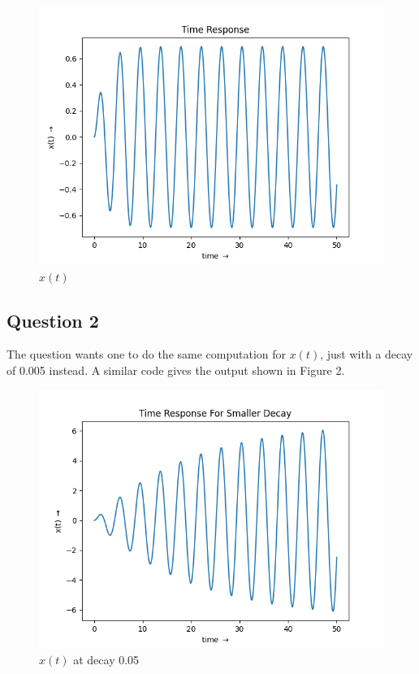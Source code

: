 \documentclass[11pt, a4paper]{article}
\begin{document}
\begin{figure}[!tbh]
   	\centering
  \includegraphics[scale=0.5]{Q1.png} 
    \caption{$x(t)$} 	
    \label{time response}
   \end{figure} 
   
\subsection{Question 2}
The question wants one to do the same computation for $x(t)$, just with a decay of 0.005 instead. A similar code gives the output shown in Figure 2. 

\begin{figure}[!tbh]
   	\centering
  \includegraphics[scale=0.5]{Q2.png} 
    \caption{$x(t)$ at decay 0.05} 	
    \label{time response 2}
   \end{figure} 
   
\end{document}
